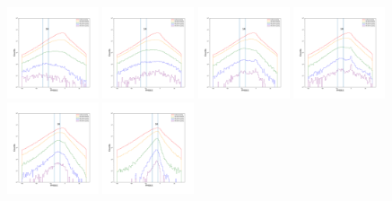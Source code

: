 \documentclass[12pt,prd]{article}
\begin{document}
\begin{figure}[h!]
\includegraphics[width=0.24\textwidth]{../figures/scanning_plotsgaiascan_l78_8_b58_4_ra224_7_dec46_3_npy_6.pdf}
\includegraphics[width=0.24\textwidth]{../figures/scanning_plotsgaiascan_l78_8_b58_4_ra224_7_dec46_3_npy_7.pdf}
\includegraphics[width=0.24\textwidth]{../figures/scanning_plotsgaiascan_l78_8_b58_4_ra224_7_dec46_3_npy_8.pdf}
\includegraphics[width=0.24\textwidth]{../figures/scanning_plotsgaiascan_l78_8_b58_4_ra224_7_dec46_3_npy_9.pdf}
\includegraphics[width=0.24\textwidth]{../figures/scanning_plotsgaiascan_l78_8_b58_4_ra224_7_dec46_3_npy_10.pdf}
\includegraphics[width=0.24\textwidth]{../figures/scanning_plotsgaiascan_l78_8_b58_4_ra224_7_dec46_3_npy_11.pdf}

\end{figure}
\end{document}
